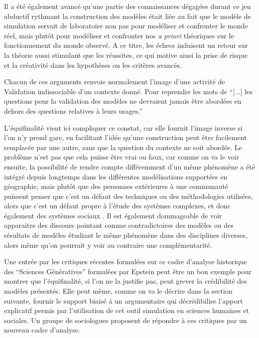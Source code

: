 Il a été également avancé qu'une partie des connaissances dégagées durant ce jeu abductif rythmant la construction des modèles était liée au fait que le modèle de simulation servait de laboratoire non pas pour modéliser et confronter le monde réel, mais plutôt pour modéliser et confronter nos \textit{a priori} théoriques sur le fonctionnement du monde observé. A ce titre, les échecs induisent un retour sur la théorie aussi stimulant que les réussites, ce qui motive ainsi la prise de risque et la créativité dans les hypothèses ou les critères avancés.

Chacun de ces arguments renvoie normalement l'image d'une activité de Validation indissociable d'un contexte donné. Pour reprendre les mots de \textcite{Amblard2006} \enquote{[...] les questions pour la validation des modèles ne devraient jamais être abordées en dehors des questions relatives à leurs usages.}

L'équifinalité vient ici compliquer ce constat, car elle fournit l'image inverse si l'on n'y prend gare, en facilitant l'idée qu'une construction peut être facilement remplacée par une autre, sans que la question du contexte ne soit abordée. Le problème n'est pas que cela puisse être vrai ou faux, car comme on va le voir ensuite, la possibilité de rendre compte différemment d'un même phénomène a été intégré depuis longtemps dans les différentes modélisations supportées en géographie, mais plutôt que des personnes extérieures à une communauté puissent penser que c'est un défaut des techniques ou des méthodologies utilisées, alors que c'est un défaut propre à l'étude des systèmes complexes, et donc également des systèmes sociaux \autocite{Elsenbroich2012}. Il est également dommageable de voir apparaitre des discours pointant comme contradictoires des modèles ou des résultats de modèles étudiant le même phénomène dans des disciplines diverses, alors même qu'on pourrait y voir au contraire une complémentarité.

Une entrée par les critiques récentes formulées sur ce cadre d'analyse historique des \enquote{Sciences Génératives} formulées par Epstein peut être un bon exemple pour montrer que l'équifinalité, si l'on ne la justifie pas, peut grever la crédibilité des modèles présentés. Elle peut même, comme on va le décrire dans la section suivante, fournir le support biaisé à un argumentaire qui décrédibilise l'apport explicatif permis par l'utilisation de cet outil simulation en sciences humaines et sociales. Un groupe de sociologues proposent de répondre à ces critiques par un nouveau cadre d'analyse.

